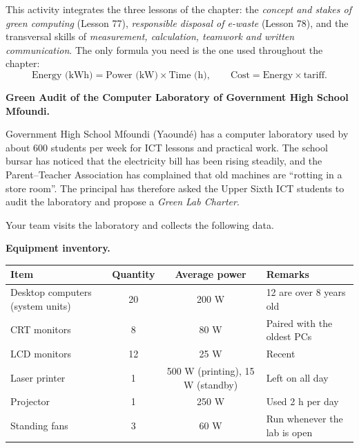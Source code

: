 \documentclass[11pt]{article}
\newcounter{popsec}
\newcounter{popsub}
\newcommand{\courssub}[1]{%
  \stepcounter{popsub}%
  \par\vspace{9pt}\noindent{\popxbold\fontsize{11.5}{13}\selectfont\color{popink}{\color{poporange}\thepopsec.\thepopsub}\hspace{6pt}#1}\par\nopagebreak\vspace{4pt}
}
\begin{document}
\begin{aretenir}
This activity integrates the three lessons of the chapter: the \emph{concept and stakes of green computing} (Lesson 77), \emph{responsible disposal of e-waste} (Lesson 78), and the transversal skills of \emph{measurement, calculation, teamwork and written communication}. The only formula you need is the one used throughout the chapter:
\[ \text{Energy (kWh)} = \text{Power (kW)} \times \text{Time (h)}, \qquad \text{Cost} = \text{Energy} \times \text{tariff}. \]
\end{aretenir}

\courssub{Situation}

\textbf{Green Audit of the Computer Laboratory of Government High School Mfoundi.}

Government High School Mfoundi (Yaoundé) has a computer laboratory used by about 600 students per week for ICT lessons and practical work. The school bursar has noticed that the electricity bill has been rising steadily, and the Parent--Teacher Association has complained that old machines are ``rotting in a store room''. The principal has therefore asked the Upper Sixth ICT students to audit the laboratory and propose a \emph{Green Lab Charter}.

Your team visits the laboratory and collects the following data.

\textbf{Equipment inventory.}

\begin{center}
\begin{tabularx}{\linewidth}{|l|c|c|X|}
\hline
\rowcolor{popblueL} \textbf{Item} & \textbf{Quantity} & \textbf{Average power} & \textbf{Remarks} \\
\hline
Desktop computers (system units) & 20 & 200 W & 12 are over 8 years old \\
\hline
CRT monitors & 8 & 80 W & Paired with the oldest PCs \\
\hline
LCD monitors & 12 & 25 W & Recent \\
\hline
Laser printer & 1 & 500 W (printing), 15 W (standby) & Left on all day \\
\hline
Projector & 1 & 250 W & Used 2 h per day \\
\hline
Standing fans & 3 & 60 W & Run whenever the lab is open \\
\hline
\end{tabularx}
\end{center}
\end{document}
